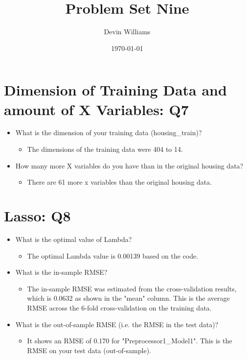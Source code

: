 \documentclass[12pt,letterpaper]{article}
\title{\textbf{Problem Set Nine}}
\author{Devin Williams}
\date{\today}
\begin{document}
\maketitle

\section{Dimension of Training Data and amount of X Variables: Q7}
\begin{itemize}
  \item What is the dimension of your training data (housing\_train)? 
    \begin{itemize}
        \item The dimensions of the training data were 404 to 14.
    \end{itemize}
  \item How many more X variables do you have than in the original housing data?
    \begin{itemize}
        \item  There are 61 more x variables than the original housing data.
    \end{itemize}
\end{itemize}

\section{Lasso: Q8}
\begin{itemize}
  \item What is the optimal value of Lambda? 
    \begin{itemize}
        \item The optimal Lambda value is 0.00139 based on the code. 
    \end{itemize}
    \item What is the in-sample RMSE? 
    \begin{itemize}
        \item The in-sample RMSE was estimated from the cross-validation results, which is 0.0632 as shown in the "mean" column. This is the average RMSE across the 6-fold cross-validation on the training data.
    \end{itemize}
     \item What is the out-of-sample RMSE (i.e. the RMSE in the test data)? 
    \begin{itemize}
        \item It shows an RMSE of 0.170 for "Preprocessor1\_Model1". This is the RMSE on your test data (out-of-sample).
    \end{itemize}
\end{itemize}
\end{document}
